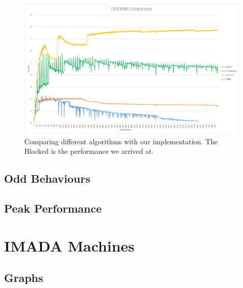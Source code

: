 \documentclass[a4paper,11pt,oneside]{book}
\begin{document}

\begin{figure}[H]
  \centering
  \includegraphics[width=0.9\linewidth]{comparison-graph.png}
  \caption{Comparing different algorithms with our implementation. The Blocked is the performance we arrived at.}
  \centering
  \label{fig:sub1}
\end{figure}

\subsection{Odd Behaviours}


\subsection{Peak Performance}


\section{IMADA Machines}
\subsection{Graphs}

\end{document}
